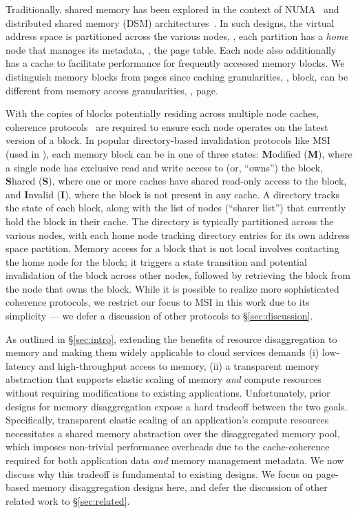  Traditionally, shared memory has been explored in the context of NUMA~\cite{sgiorigin, amdopteron1, amdopteron2, intelqpi1, intelqpi2} and distributed shared memory (DSM) architectures~\cite{munin, midway, dpram, gam, dash}. In such designs, the virtual address space is partitioned across the various nodes, \ie, each partition has a \textit{home} node that manages its metadata, \eg, the page table. Each node also additionally has a cache to facilitate performance for frequently accessed memory blocks. We distinguish memory blocks from pages since caching granularities, \ie, block, can be different from memory access granularities, \ie, page. 

With the copies of blocks potentially residing across multiple node caches, coherence protocols~\cite{msi, mesi, mesif, moesi, mosi} are required to ensure each node operates on the latest version of a block. In popular directory-based invalidation protocols like MSI~\cite{msi} (used in \mind), each memory block can be in one of three states: \textbf{M}odified (\textbf{M}), where a single node has exclusive read and write access to (or, ``owns'') the block, \textbf{S}hared (\textbf{S}), where one or more caches have shared read-only access to the block, and \textbf{I}nvalid (\textbf{I}), where the block is not present in any cache. A directory tracks the state of each block, along with the list of nodes (``sharer list'') that currently hold the block in their cache. The directory is typically partitioned across the various nodes, with each home node tracking directory entries for its own address space partition. Memory access for a block that is not local involves contacting the home node for the block; it triggers a state transition and potential invalidation of the block across other nodes, followed by retrieving the block from the node that owns the block. While it is possible to realize more sophisticated coherence protocols, we restrict our focus to MSI in this work due to its simplicity --- we defer a discussion of other protocols to \S\ref{sec:discussion}.

As outlined in \S\ref{sec:intro}, extending the benefits of resource disaggregation to memory and making them widely applicable to cloud services demands (i) low-latency and high-throughput access to memory, (ii) a transparent memory abstraction that supports elastic scaling of memory \textit{and} compute resources without requiring modifications to existing applications. Unfortunately, prior designs for memory disaggregation expose a hard tradeoff between the two goals. Specifically, transparent elastic scaling of an application's compute resources necessitates a shared memory abstraction over the disaggregated memory pool, which imposes non-trivial performance overheads due to the cache-coherence required for both application data \textit{and} memory management metadata. We now discuss why this tradeoff is fundamental to existing designs. We focus on page-based memory disaggregation designs here, and defer the discussion of other related work to \S\ref{sec:related}.

